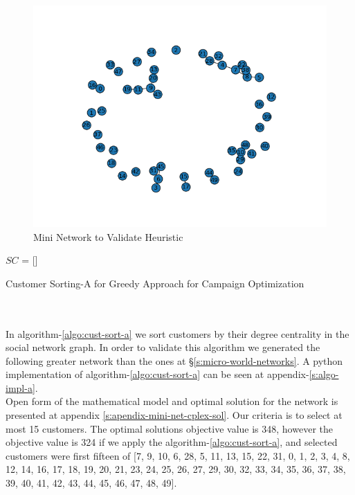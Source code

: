 \documentclass[11pt]{article}
\begin{document}
\begin{figure}[h!]
    \centering
    \includegraphics[width=12cm]{mini_world_case.png}
    \caption{Mini Network to Validate Heuristic}
    \label{fig:fig_mini_world_case}
\end{figure}

\begin{algorithm}[H]
\DontPrintSemicolon
{}
$SC$ = []\;
\;
\caption{Customer Sorting-A for Greedy Approach for Campaign Optimization}
\label{algo:cust-sort-a}
\end{algorithm}
\\
\hbox{}
\\
In algorithm-\ref{algo:cust-sort-a} we sort customers by their degree centrality in the social network graph. In order to validate this algorithm we generated the following greater network than the ones at \S \ref{s:micro-world-networks}. A python implementation of algorithm-\ref{algo:cust-sort-a} can be seen at appendix-\ref{s:algo-impl-a}.\\

Open form of the mathematical model and optimal solution for the network is presented at appendix \ref{s:apendix-mini-net-cplex-sol}. Our criteria is to select at most 15 customers. The optimal solutions objective value is 348, however the objective value is 324 if we apply the algorithm-\ref{algo:cust-sort-a}, and selected customers were first fifteen of [7, 9, 10, 6, 28, 5, 11, 13, 15, 22, 31, 0, 1, 2, 3, 4, 8, 12, 14, 16, 17, 18, 19, 20, 21, 23, 24, 25, 26, 27, 29, 30, 32, 33, 34, 35, 36, 37, 38, 39, 40, 41, 42, 43, 44, 45, 46, 47, 48, 49]. \\
\end{document}
